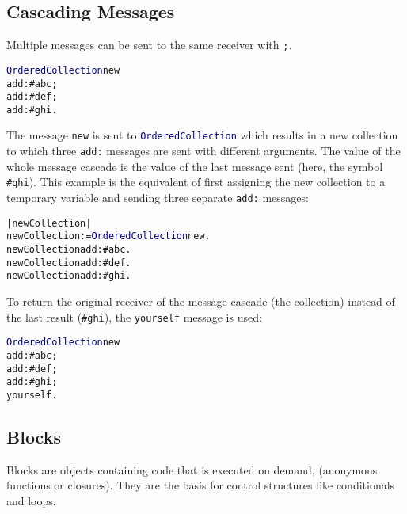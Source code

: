 \subsection{Cascading Messages}

Multiple messages can be sent to the same receiver with \texttt{;}.

\begin{alltt}
\textcolor{darkBlue}{OrderedCollection} new
  add: \textcolor{string}{#abc};
  add: \textcolor{string}{#def};
  add: \textcolor{string}{#ghi}.
\end{alltt}

The message \texttt{new} is sent to \texttt{\textcolor{darkBlue}{OrderedCollection}} which
results in a new collection to which three \texttt{add:} messages are sent with different arguments.
The value of the whole message cascade is the value of the last message sent (here, the symbol \textcolor{string}{\texttt{\#ghi}}).
This example is the equivalent of first assigning the new collection to a temporary variable and sending three separate \texttt{add:} messages:

\begin{alltt}
| newCollection | 
newCollection := \textcolor{darkBlue}{OrderedCollection} new.
newCollection add: \textcolor{string}{#abc}.
newCollection add: \textcolor{string}{#def}.
newCollection add: \textcolor{string}{#ghi}.
\end{alltt}


To return the original receiver of the message cascade (\ie the collection) instead of the last result (\ie \textcolor{string}{\texttt{\#ghi}}), the \texttt{yourself} message is used:

\begin{alltt}
\textcolor{darkBlue}{OrderedCollection} new
  add: \textcolor{string}{#abc};
  add: \textcolor{string}{#def};
  add: \textcolor{string}{#ghi};
  yourself.
\end{alltt}

\subsection{Blocks}

Blocks are objects containing code that is executed on demand,
(anonymous functions or closures).
They are the basis for control structures like conditionals and loops.

